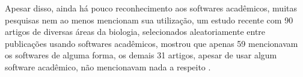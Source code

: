 %
%


Apesar disso, ainda há pouco reconhecimento aos softwares acadêmicos, muitas
pesquisas nem ao menos mencionam sua utilização, um estudo recente com 90
artigos de diversas áreas da biologia, selecionados aleatoriamente entre
publicações usando softwares acadêmicos, mostrou que apenas 59 mencionavam os
softwares de alguma forma, os demais 31 artigos, apesar de usar algum software
acadêmico, não mencionavam nada a respeito \cite{howison2016software}.

